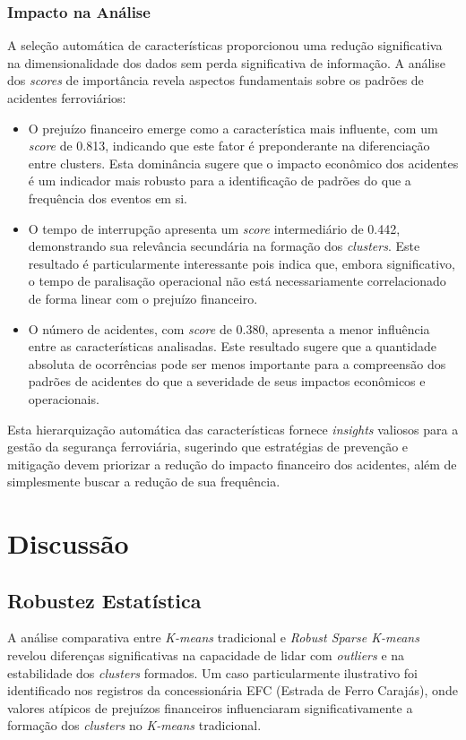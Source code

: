 \documentclass[conference]{IEEEtran}
\begin{document}
\subsubsection{Impacto na Análise}
A seleção automática de características proporcionou uma redução significativa na dimensionalidade dos dados sem perda significativa de informação. A análise dos \textit{scores} de importância revela aspectos fundamentais sobre os padrões de acidentes ferroviários:

\begin{itemize}

\item O prejuízo financeiro emerge como a característica mais influente, com um \textit{score} de 0.813, indicando que este fator é preponderante na diferenciação entre clusters. Esta dominância sugere que o impacto econômico dos acidentes é um indicador mais robusto para a identificação de padrões do que a frequência dos eventos em si.

\item O tempo de interrupção apresenta um \textit{score} intermediário de 0.442, demonstrando sua relevância secundária na formação dos \textit{clusters}. Este resultado é particularmente interessante pois indica que, embora significativo, o tempo de paralisação operacional não está necessariamente correlacionado de forma linear com o prejuízo financeiro.

\item O número de acidentes, com \textit{score} de 0.380, apresenta a menor influência entre as características analisadas. Este resultado sugere que a quantidade absoluta de ocorrências pode ser menos importante para a compreensão dos padrões de acidentes do que a severidade de seus impactos econômicos e operacionais.

\end{itemize}

Esta hierarquização automática das características fornece \textit{insights} valiosos para a gestão da segurança ferroviária, sugerindo que estratégias de prevenção e mitigação devem priorizar a redução do impacto financeiro dos acidentes, além de simplesmente buscar a redução de sua frequência.

    
\section{Discussão}

\subsection{Robustez Estatística}
A análise comparativa entre \textit{K-means} tradicional e \textit{Robust Sparse K-means} revelou diferenças significativas na capacidade de lidar com \textit{outliers} e na estabilidade dos \textit{clusters} formados. Um caso particularmente ilustrativo foi identificado nos registros da concessionária EFC (Estrada de Ferro Carajás), onde valores atípicos de prejuízos financeiros influenciaram significativamente a formação dos \textit{clusters} no \textit{K-means} tradicional.
\end{document}
